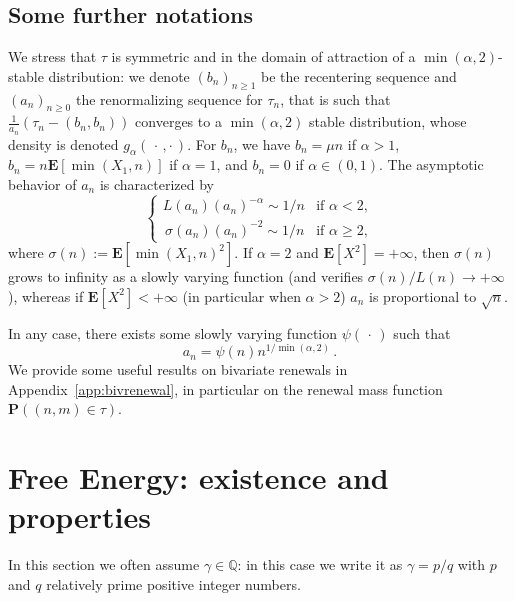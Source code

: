 \documentclass[10pt]{amsart}
\theoremstyle{definition}\newtheorem{defi}[theo]{Definition}\newtheorem{rema}[theo]{Remark}\newtheorem{exam}[theo]{Example}\newtheorem{exem}[theo]{Example}\newtheorem{nota}[theo]{Notation}
\newcommand{\ga}{\alpha}
\newcommand{\bP}{\ensuremath{\mathbf{P}}}
\newcommand{\bE}{\ensuremath{\mathbf{E}}}
\newcommand{\bbQ}{\ensuremath{\mathbb{Q}}}
\begin{document}
\subsection{Some further notations}\label{sec:defan}

We stress that $\tau$ is symmetric and in the domain of attraction of a $\min(\ga,2)$-stable distribution: we denote $(b_n)_{n\geq 1}$ be the recentering sequence and ${(a_n)}_{n \ge 0}$ the renormalizing sequence for $\tau_n$, that is such that $\tfrac{1}{a_n} (\tau_n - (b_n,b_n))$ converges to a $\min(\ga,2)$ stable distribution, whose density is denoted $g_\ga({\,\cdot\,,\cdot\,})$. For $b_n$, we have $b_n=\mu n$ if $\ga>1$, $b_n= n\bE[\min(X_1, n)]$ if $\ga=1$, and $b_n=0$ if $\ga \in(0,1)$. The asymptotic behavior of $a_n$ is characterized by
\begin{equation}\label{def:an}
\begin{cases}
L(a_n) (a_n)^{-\ga} \sim 1/n &\text{if } \ga<2,\\
\,\sigma(a_n) (a_n)^{-2} \sim 1/n &\text{if } \ga\geq 2,
\end{cases}
\end{equation}
where $\sigma(n):=\bE[\min(X_1, n)^2]$. If $\ga = 2$ and $\bE[X^2]=+\infty$, then $\sigma(n)$ grows to infinity as a slowly varying function (and verifies $\sigma(n)/L(n) \to +\infty$), whereas if $\bE[X^2]<+\infty$ (in particular when $\ga>2$) $a_n$ is proportional to $\sqrt{n}$.

In any case, there exists some slowly varying function $\psi({\,\cdot\,})$ such that
\begin{equation}
a_n = \psi(n) n^{1/\min(\ga, 2)}\,.\label{an}
\end{equation}
We provide some useful results on bivariate renewals in Appendix~\ref{app:bivrenewal}, in particular on the renewal mass function $\bP((n,m)\in\tau)$.


\section{Free Energy: existence and properties}\label{sec:existence}

In this section we often assume $\gamma\in \bbQ$: in this case we write it as $\gamma=p/q$ with $p$ and $q$ relatively prime positive integer numbers.
\end{document}
